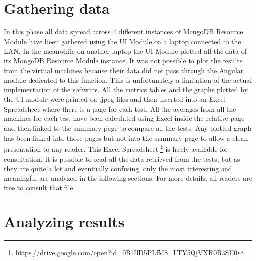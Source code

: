 \section{Gathering data}
\label{sec:3}
In this phase all data spread across 4 different instances of MongoDB Resource Module have been gathered using the UI Module on a laptop connected to the LAN.
In the meanwhile on another laptop the UI Module plotted all the data of its MongoDB Resource Module instance. It was not possible to plot the results from the virtual machines because their data did not pass through the Angular module dedicated to this function. This is unfortunately a limitation of the actual implementation of the software.
All the metrics tables and the graphs plotted by the UI module were printed on .jpeg files and then inserted into an Excel Spreadsheet where there is a page for each test. All the averages from all the machines for each test have been calculated using Excel inside the relative page and then linked to the summary page to compare all the tests. Any plotted graph has been linked into those pages but not into the summary page to allow a clean presentation to any reader.
This Excel Spreadsheet \footnote{https://drive.google.com/open?id=0B1IlD5PLfM8\_LTY5QjVXR0R3SE0} is freely available for consultation. 
It is possible to read all the data retrieved from the tests, but as they are quite a lot and eventually confusing, only the most interesting and meaningful are analyzed in the following sections. For more details, all readers are free to consult that file.

\section{Analyzing results}
\label{sec:4}

